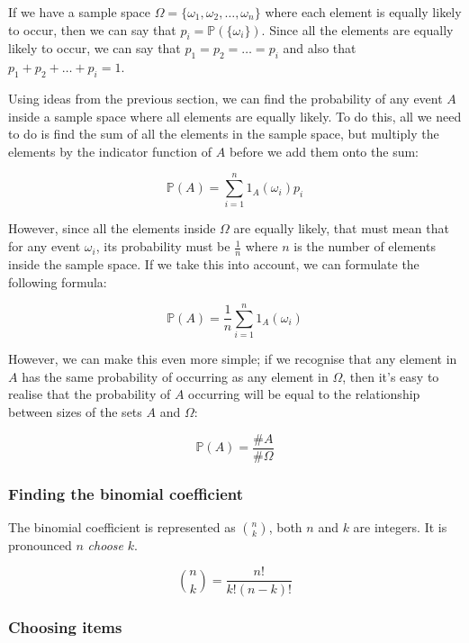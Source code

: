 If we have a sample space $\Omega = \{ \omega_1, \omega_2, \dots, \omega_n \}$
where each element is equally likely to occur, then we can say that $p_i =
\mathbb{P}(\{\omega_i\})$. Since all the elements are equally likely to occur,
we can say that $p_1 = p_2 = \dots = p_i$ and also that $p_1 + p_2 + \dots + p_i
= 1$.

Using ideas from the previous section, we can find the probability of any event
$A$ inside a sample space where all elements are equally likely. To do this, all
we need to do is find the sum of all the elements in the sample space, but
multiply the elements by the indicator function of $A$ before we add them onto
the sum:

\begin{dmath*}
	\mathbb{P}(A) = \sum\limits_{i=1}^{n} 1_A(\omega_i)p_i
\end{dmath*}

However, since all the elements inside $\Omega$ are equally likely, that must
mean that for any event $\omega_i$, its probability must be $\frac{1}{n}$ where
$n$ is the number of elements inside the sample space. If we take this into
account, we can formulate the following formula:

\begin{dmath*}
	\mathbb{P}(A) = \frac{1}{n}\sum\limits_{i=1}^{n} 1_A(\omega_i)
\end{dmath*}


However, we can make this even more simple; if we recognise that any element in
$A$ has the same probability of occurring as any element in $\Omega$, then it's
easy to realise that the probability of $A$ occurring will be equal to the
relationship between sizes of the sets $A$ and $\Omega$:

\begin{dmath*}
	\mathbb{P}(A) = \frac{\#A}{\#\Omega}
\end{dmath*}

\subsubsection{Finding the binomial coefficient}

The binomial coefficient is represented as $n \choose k$, both $n$ and $k$ are
integers. It is pronounced $n$ {\it choose} $k$.

\begin{dmath*}
	{n \choose k} = \frac{n!}{k!(n-k)!}
\end{dmath*}

\subsubsection{Choosing items}

